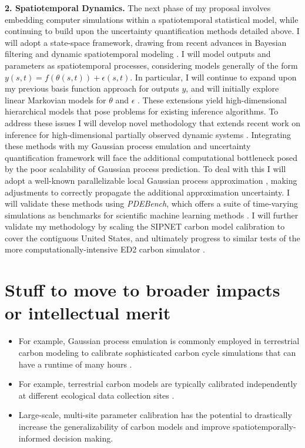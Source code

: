 \documentclass[11pt]{article}
\begin{document}
 \textbf{2. Spatiotemporal Dynamics.}
 The next phase of my proposal involves embedding computer simulations within a spatiotemporal statistical model, while continuing to build upon the uncertainty quantification methods detailed above. I will adopt a state-space framework, drawing from recent advances in Bayesian filtering 
 \cite{Sarkka} and dynamic spatiotemporal modeling \cite{Wikle, Hefley}. I will model outputs and parameters as spatiotemporal processes, considering models generally of the form $y(s, t) = f(\theta(s, t)) + \epsilon(s, t)$. In particular, I will continue to expand upon my previous basis function approach for outputs $y$, and will initially explore linear Markovian models for $\theta$ and $\epsilon$ \cite{Wikle}.
These extensions yield high-dimensional hierarchical models that pose problems for existing inference algorithms. To address these issues I will develop novel methodology that extends recent work on inference for high-dimensional partially observed dynamic systems \cite{Park}. Integrating these methods with my Gaussian process emulation and uncertainty quantification framework will face the additional computational bottleneck posed by the poor scalability of Gaussian process prediction. To deal with this I will adopt a well-known parallelizable local Gaussian process approximation \cite{Gramacy}, making adjustments to correctly propagate the additional approximation uncertainty. I will validate these methods using \textit{PDEBench}, which offers a suite of time-varying simulations as benchmarks for scientific machine learning methods \cite{Takamoto}. I will further validate my methodology by scaling the SIPNET carbon model calibration to cover the contiguous United States, and ultimately progress to similar tests of the more computationally-intensive ED2 carbon simulator \cite{Fer, Fer2}.

\section{Stuff to move to broader impacts or intellectual merit}
\begin{itemize}
\item For example, Gaussian process emulation is commonly employed in terrestrial carbon modeling to calibrate sophisticated carbon cycle simulations that can have a runtime of many hours \cite{Fer}.
\item For example, terrestrial carbon models are typically calibrated independently at different ecological data collection sites \cite{Fer2}.
\item Large-scale, multi-site parameter calibration has the potential to drastically increase the generalizability of carbon models and improve spatiotemporally-informed decision making. 
\end{itemize}
\end{document}
